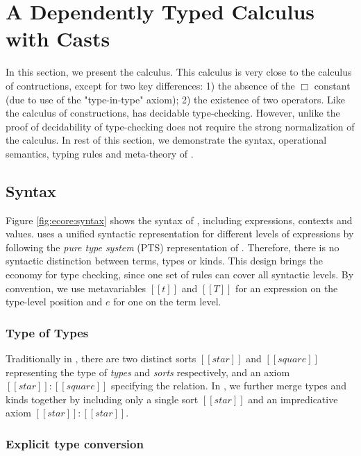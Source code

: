 
\section{A Dependently Typed Calculus with Casts}\label{sec:ecore}

In this section, we present the \ecore calculus. This calculus is very 
close to the calculus of contructions, except for two key differences: 
1) the absence of the $\Box$ constant (due to use of the "type-in-type"
axiom); 2) the existence of two \cast operators. Like the calculus 
of constructions, \ecore has decidable type-checking. However, unlike
\cc the proof of decidability of type-checking does not require 
the strong normalization of the calculus. 
In rest of this
section, we demonstrate the syntax, operational semantics, typing
rules and meta-theory of \ecore.


\subsection{Syntax}\label{sec:ecore:syn}

Figure \ref{fig:ecore:syntax} shows the syntax of \ecore, including
expressions, contexts and values. \ecore uses a unified syntactic
representation for different levels of expressions by following the
\emph{pure type system} (PTS) representation of \cc. Therefore, there
is no syntactic distinction between terms, types or kinds. This design
brings the economy for type checking, since one set of rules can cover
all syntactic levels. By convention, we use metavariables $[[t]]$ and
$[[T]]$ for an expression on the type-level position and $e$ for one
on the term level.

\subsubsection{Type of Types}
Traditionally in \cc, there are two distinct
sorts $[[star]]$ and $[[square]]$ representing the type of
\emph{types} and \emph{sorts} respectively, and an axiom
$[[star]]:[[square]]$ specifying the relation. In \ecore, we further
merge types and kinds together by including only a single sort
$[[star]]$ and an impredicative axiom $[[star]]:[[star]]$. 


\subsubsection{Explicit type conversion}

